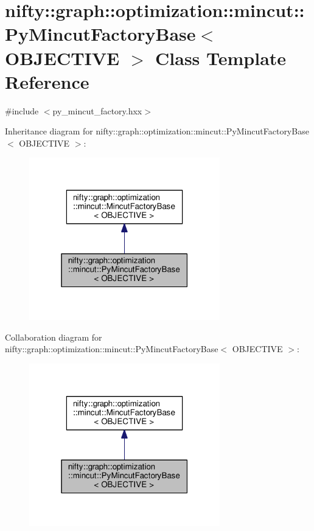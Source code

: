 \hypertarget{classnifty_1_1graph_1_1optimization_1_1mincut_1_1PyMincutFactoryBase}{}\section{nifty\+:\+:graph\+:\+:optimization\+:\+:mincut\+:\+:Py\+Mincut\+Factory\+Base$<$ O\+B\+J\+E\+C\+T\+I\+V\+E $>$ Class Template Reference}
\label{classnifty_1_1graph_1_1optimization_1_1mincut_1_1PyMincutFactoryBase}


{\ttfamily \#include $<$py\+\_\+mincut\+\_\+factory.\+hxx$>$}



Inheritance diagram for nifty\+:\+:graph\+:\+:optimization\+:\+:mincut\+:\+:Py\+Mincut\+Factory\+Base$<$ O\+B\+J\+E\+C\+T\+I\+V\+E $>$\+:\nopagebreak
\begin{figure}[H]
\begin{center}
\leavevmode
\includegraphics[width=235pt]{classnifty_1_1graph_1_1optimization_1_1mincut_1_1PyMincutFactoryBase__inherit__graph}
\end{center}
\end{figure}


Collaboration diagram for nifty\+:\+:graph\+:\+:optimization\+:\+:mincut\+:\+:Py\+Mincut\+Factory\+Base$<$ O\+B\+J\+E\+C\+T\+I\+V\+E $>$\+:\nopagebreak
\begin{figure}[H]
\begin{center}
\leavevmode
\includegraphics[width=235pt]{classnifty_1_1graph_1_1optimization_1_1mincut_1_1PyMincutFactoryBase__coll__graph}
\end{center}
\end{figure}
